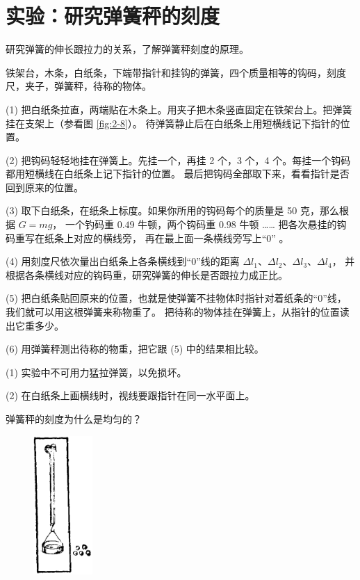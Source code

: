 \section{实验：研究弹簧秤的刻度}\label{sec:2-5}

 研究弹簧的伸长跟拉力的关系，了解弹簧秤刻度的原理。

 铁架台，木条，白纸条，下端带指针和挂钩的弹簧，四个质量相等的钩码，刻度尺，夹子，弹簧秤，待称的物体。


(1) 把白纸条拉直，两端贴在木条上。用夹子把木条竖直固定在铁架台上。把弹簧挂在支架上（参看图 \ref{fig:2-8}）。
待弹簧静止后在白纸条上用短横线记下指针的位置。

(2) 把钩码轻轻地挂在弹簧上。先挂一个，再挂 2 个，3 个，4 个。每挂一个钩码都用短横线在白纸条上记下指针的位置。
最后把钩码全部取下来，看看指针是否回到原来的位置。

(3) 取下白纸条，在纸条上标度。如果你所用的钩码每个的质量是 50 克，那么根据 $G = mg$，
一个钓码重 $0.49$ 牛顿，两个钩码重 $0.98$ 牛顿 …… 把各次悬挂的钩码重写在纸条上对应的横线旁，
再在最上面一条横线旁写上“0” 。

(4) 用刻度尺依次量出白纸条上各条横线到“0”线的距离 $\Delta l_1$、$\Delta l_2$、$\Delta l_3$、$\Delta l_4$，
并根据各条横线对应的钩码重，研究弹簧的伸长是否跟拉力成正比。

(5) 把白纸条贴回原来的位置，也就是使弹簧不挂物体时指针对着纸条的“0”线，我们就可以用这根弹簧来称物重了。
把待称的物体挂在弹簧上，从指针的位置读出它重多少。

(6) 用弹簧秤测出待称的物重，把它跟 (5) 中的结果相比较。


(1) 实验中不可用力猛拉弹簧，以免损坏。

(2) 在白纸条上画横线时，视线要跟指针在同一水平面上。

 弹簧秤的刻度为什么是均匀的？



\begin{figure}
    \centering
    \includegraphics[width=0.2\textwidth]{../pic/czwl1-ch2-10}
    \caption{}\label{fig:2-10}
\end{figure}

